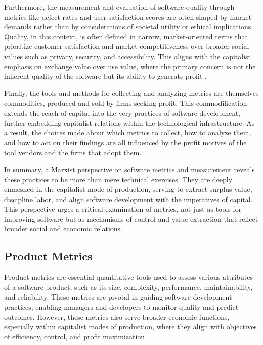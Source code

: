 \begin{refsection}
Furthermore, the measurement and evaluation of software quality through metrics like defect rates and user satisfaction scores are often shaped by market demands rather than by considerations of societal utility or ethical implications. Quality, in this context, is often defined in narrow, market-oriented terms that prioritize customer satisfaction and market competitiveness over broader social values such as privacy, security, and accessibility. This aligns with the capitalist emphasis on exchange value over use value, where the primary concern is not the inherent quality of the software but its ability to generate profit \cite[pp.~141-144]{Harvey2007Limits}.

Finally, the tools and methods for collecting and analyzing metrics are themselves commodities, produced and sold by firms seeking profit. This commodification extends the reach of capital into the very practices of software development, further embedding capitalist relations within the technological infrastructure. As a result, the choices made about which metrics to collect, how to analyze them, and how to act on their findings are all influenced by the profit motives of the tool vendors and the firms that adopt them.

In summary, a Marxist perspective on software metrics and measurement reveals these practices to be more than mere technical exercises. They are deeply enmeshed in the capitalist mode of production, serving to extract surplus value, discipline labor, and align software development with the imperatives of capital. This perspective urges a critical examination of metrics, not just as tools for improving software but as mechanisms of control and value extraction that reflect broader social and economic relations.

\subsection{Product Metrics}

Product metrics are essential quantitative tools used to assess various attributes of a software product, such as its size, complexity, performance, maintainability, and reliability. These metrics are pivotal in guiding software development practices, enabling managers and developers to monitor quality and predict outcomes. However, these metrics also serve broader economic functions, especially within capitalist modes of production, where they align with objectives of efficiency, control, and profit maximization.


\end{refsection}
